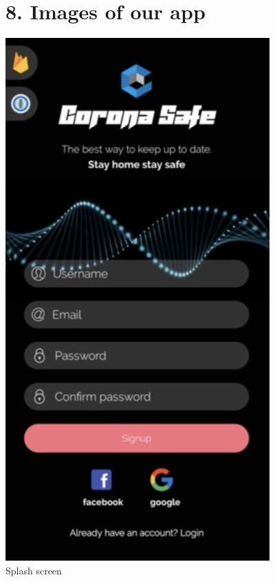 \section*{\LARGE 8. Images of our app}
\begin{center}
\includegraphics[scale=0.55]{splash.png}\\[0.75cm]
\caption{Splash screen}
\end{center}
